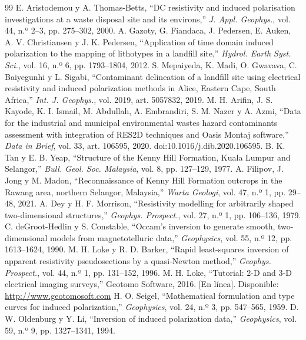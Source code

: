 \documentclass[conference]{IEEEtran}
\begin{document}
\begin{thebibliography}{99}
 E. Aristodemou y A. Thomas-Betts, ``DC resistivity and induced polarisation investigations at a waste disposal site and its environs,'' \textit{J. Appl. Geophys.}, vol. 44, n.º 2--3, pp. 275--302, 2000.
 A. Gazoty, G. Fiandaca, J. Pedersen, E. Auken, A. V. Christiansen y J. K. Pedersen, ``Application of time domain induced polarization to the mapping of lithotypes in a landfill site,'' \textit{Hydrol. Earth Syst. Sci.}, vol. 16, n.º 6, pp. 1793--1804, 2012.
 S. Mepaiyeda, K. Madi, O. Gwavava, C. Baiyegunhi y L. Sigabi, ``Contaminant delineation of a landfill site using electrical resistivity and induced polarization methods in Alice, Eastern Cape, South Africa,'' \textit{Int. J. Geophys.}, vol. 2019, art. 5057832, 2019.
 M. H. Arifin, J. S. Kayode, K. I. Ismail, M. Abdullah, A. Embrandiri, S. M. Nazer y A. Azmi, ``Data for the industrial and municipal environmental wastes hazard contaminants assessment with integration of RES2D techniques and Oasis Montaj software,'' \textit{Data in Brief}, vol. 33, art. 106595, 2020. doi:10.1016/j.dib.2020.106595.
 B. K. Tan y E. B. Yeap, ``Structure of the Kenny Hill Formation, Kuala Lumpur and Selangor,'' \textit{Bull. Geol. Soc. Malaysia}, vol. 8, pp. 127--129, 1977.
 A. Filipov, J. Jong y M. Madon, ``Reconnaissance of Kenny Hill Formation outcrops in the Rawang area, northern Selangor, Malaysia,'' \textit{Warta Geologi}, vol. 47, n.º 1, pp. 29--48, 2021.
 A. Dey y H. F. Morrison, ``Resistivity modelling for arbitrarily shaped two-dimensional structures,'' \textit{Geophys. Prospect.}, vol. 27, n.º 1, pp. 106--136, 1979.
 C. deGroot-Hedlin y S. Constable, ``Occam's inversion to generate smooth, two-dimensional models from magnetotelluric data,'' \textit{Geophysics}, vol. 55, n.º 12, pp. 1613--1624, 1990.
 M. H. Loke y R. D. Barker, ``Rapid least-squares inversion of apparent resistivity pseudosections by a quasi-Newton method,'' \textit{Geophys. Prospect.}, vol. 44, n.º 1, pp. 131--152, 1996.
 M. H. Loke, ``Tutorial: 2-D and 3-D electrical imaging surveys,'' Geotomo Software, 2016. [En línea]. Disponible: \url{http://www.geotomosoft.com}
 H. O. Seigel, ``Mathematical formulation and type curves for induced polarization,'' \textit{Geophysics}, vol. 24, n.º 3, pp. 547--565, 1959.
 D. W. Oldenburg y Y. Li, ``Inversion of induced polarization data,'' \textit{Geophysics}, vol. 59, n.º 9, pp. 1327--1341, 1994.

\end{thebibliography}
\end{document}

